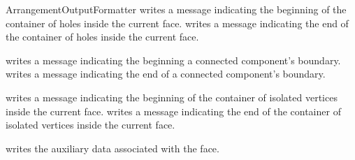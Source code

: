 \begin{ccRefConcept}{ArrangementOutputFormatter}
    {writes a message indicating the beginning of the container of holes inside the
     current face.}
\ccGlue
{}
    {writes a message indicating the end of the container of holes inside the
     current face.}

    {writes a message indicating the beginning a connected component's boundary.}
\ccGlue
{}
    {writes a message indicating the end of a connected component's boundary.}

    {writes a message indicating the beginning of the container of isolated vertices
     inside the current face.}
\ccGlue
{}
    {writes a message indicating the end of the container of isolated vertices inside
     the current face.}

    {writes the auxiliary data associated with the face.}

\ccHasModels

\\
\\

\end{ccRefConcept}

\ccRefPageEnd

